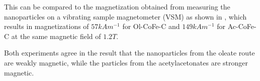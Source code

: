 \documentclass[\main/dresen_thesis.tex]{subfiles}
\begin{document}
    This can be compared to the magnetization obtained from measuring the nanoparticles on a vibrating sample magnetometer (VSM) as shown in , which results in magnetizations of $57 \unit{kAm^{-1}}$ for Ol-CoFe-C and $149 \unit{kAm^{-1}}$ for Ac-CoFe-C at the same magnetic field of $1.2 \unit{T}$.

    Both experiments agree in the result that the nanoparticles from the oleate route are weakly magnetic, while the particles from the acetylacetonates are stronger magnetic.

\end{document}
